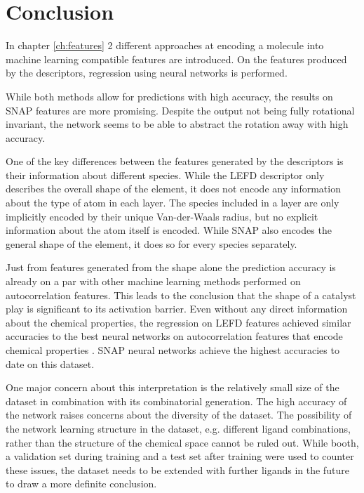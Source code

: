 
\chapter{Conclusion}
\label{ch:Conclusion}
In chapter \ref{ch:features} 2 different approaches at encoding a molecule into machine learning compatible features are introduced.
On the features produced by the descriptors, regression using neural networks is performed.

While both methods allow for predictions with high accuracy, the results on SNAP features are more promising.
Despite the output not being fully rotational invariant, the network seems to be able to abstract the rotation away with high accuracy.

One of the key differences between the features generated by the descriptors is their information about 
different species.
While the LEFD descriptor only describes the overall shape of the element, it does not encode any information about the 
type of atom in each layer.
The species included in a layer are only implicitly encoded by their unique Van-der-Waals radius, but no explicit information about the 
atom itself is encoded.
While SNAP also encodes the general shape of the element, it does so for every species separately.

Just from features generated from the shape alone the prediction accuracy is already on a par with other machine learning methods performed on autocorrelation features.
This leads to the conclusion that the shape of a catalyst play is significant to its activation barrier.
Even without any direct information about the chemical properties, the regression on LEFD features achieved similar accuracies to
the best neural networks on autocorrelation features that encode chemical properties \cite{friederich_dos}.
SNAP neural networks achieve the highest accuracies to date on this dataset.

One major concern about this interpretation is the relatively small size of the dataset in combination 
with its combinatorial generation.
The high accuracy of the network raises concerns about the diversity of the dataset.
The possibility of the network learning structure in the dataset, e.g. different ligand combinations,
rather than the structure of the chemical space cannot be ruled out.
While booth, a validation set during training and a test set after training were used to counter these issues,
the dataset needs to be extended with further ligands in the future to draw a more definite conclusion.

